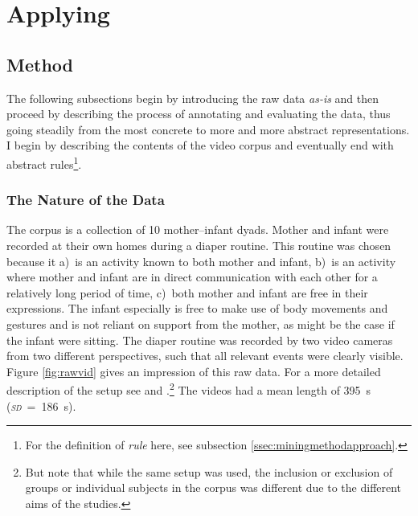 
\chapter{Applying \fpmupper}
\label{ch:mining}

\section{Method}
\label{sec:miningmethod}
The following subsections begin by introducing the raw data \emph{as-is} and then proceed by describing the process of annotating and evaluating the data, thus going steadily from the most concrete to more and more abstract representations. I begin by describing the contents of the video corpus and eventually end with abstract rules\footnote{For the definition of \emph{rule} here, see subsection \ref{ssec:miningmethodapproach}.}.

\subsection{The Nature of the Data}
\label{ssec:miningmethodnature}
The corpus is a collection of 10 mother--infant dyads. Mother and infant were recorded at their own homes during a diaper routine. This routine was chosen because it a)~is an activity known to both mother and infant, b)~is an activity where mother and infant are in direct communication with each other for a relatively long period of time, c)~both mother and infant are free in their expressions. The infant especially is free to make use of body movements and gestures and is not reliant on support from the mother, as might be the case if the infant were sitting. The diaper routine was recorded by two video cameras from two different perspectives, such that all relevant events were clearly visible. Figure \ref{fig:rawvid} gives an impression of this raw data. For a more detailed description of the setup see \citet[]{nomikou17} and \citet[]{nomikou11}.\footnote{But note that while the same setup was used, the inclusion or exclusion of groups or individual subjects in the corpus was different due to the different aims of the studies.} The videos had a mean length of 395~s (\emph{\textsc{sd}}~=~186~s).

